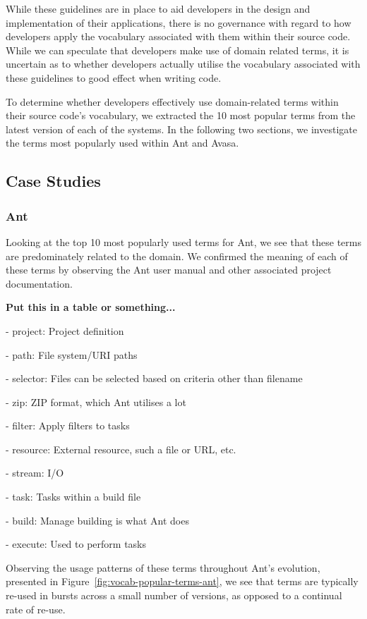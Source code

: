 While these guidelines are in place to aid developers in the design and implementation of their applications, there is no governance with regard to how developers apply the vocabulary associated with them within their source code. While we can speculate that developers make use of domain related terms, it is uncertain as to whether developers actually utilise the vocabulary associated with these guidelines to good effect when writing code.

To determine whether developers effectively use domain-related terms within their source code's vocabulary, we extracted the 10 most popular terms from the latest version of each of the systems. In the following two sections, we investigate the terms most popularly used within Ant and Avasa.

\subsection{Case Studies} %
\label{sub:case_studies}

\subsubsection{Ant} %
\label{ssub:ant}

Looking at the top 10 most popularly used terms for Ant, we see that these terms are predominately related to the domain. We confirmed the meaning of each of these terms by observing the Ant user manual and other associated project documentation.

\crumbs
{
	\textbf{Put this in a table or something...}

	- project: Project definition
	
	- path: File system/URI paths
	
	- selector: Files can be selected based on criteria other than filename
	
	- zip: ZIP format, which Ant utilises a lot
	
	- filter: Apply filters to tasks
	
	- resource: External resource, such a file or URL, etc.
	
	- stream: I/O
	
	- task: Tasks within a build file
	
	- build: Manage building is what Ant does
	
	- execute: Used to perform tasks
}

Observing the usage patterns of these terms throughout Ant's evolution, presented in Figure~\ref{fig:vocab-popular-terms-ant}, we see that terms are typically re-used in bursts across a small number of versions, as opposed to a continual rate of re-use.

